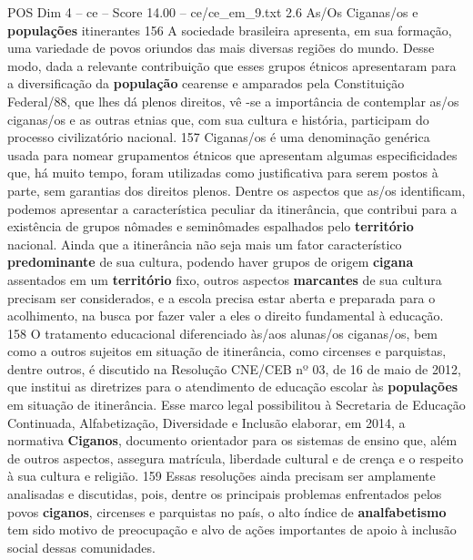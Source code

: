 \begin{textsample}{POS Dim 4 – ce – Score 14.00 – ce/ce\_em\_9.txt}  \label{ex:f4_pos_132}
2.6 As/Os Ciganas/os e \textbf{populações} itinerantes 156 A sociedade brasileira apresenta, em sua formação, uma variedade de povos oriundos das mais diversas regiões do mundo.
Desse modo, dada a relevante contribuição que esses grupos étnicos apresentaram para a diversificação da \textbf{população} cearense e amparados pela Constituição Federal/88, que lhes dá plenos direitos, vê -se a importância de contemplar as/os ciganas/os e as outras etnias que, com sua cultura e história, participam do processo civilizatório nacional. 157 Ciganas/os é uma denominação genérica usada para nomear grupamentos étnicos que apresentam algumas especificidades que, há muito tempo, foram utilizadas como justificativa para serem postos à parte, sem garantias dos direitos plenos.
Dentre os aspectos que as/os identificam, podemos apresentar a característica peculiar da itinerância, que contribui para a existência de grupos nômades e seminômades espalhados pelo \textbf{território} nacional.
Ainda que a itinerância não seja mais um fator característico \textbf{predominante} de sua cultura, podendo haver grupos de origem \textbf{cigana} assentados em um \textbf{território} fixo, outros aspectos \textbf{marcantes} de sua cultura precisam ser considerados, e a escola precisa estar aberta e preparada para o acolhimento, na busca por fazer valer a eles o direito fundamental à educação. 158 O tratamento educacional diferenciado às/aos alunas/os ciganas/os, bem como a outros sujeitos em situação de itinerância, como circenses e parquistas, dentre outros, é discutido na Resolução CNE/CEB nº 03, de 16 de maio de 2012, que institui as diretrizes para o atendimento de educação escolar às \textbf{populações} em situação de itinerância.
Esse marco legal possibilitou à Secretaria de Educação Continuada, Alfabetização, Diversidade e Inclusão elaborar, em 2014, a normativa \textbf{Ciganos}, documento orientador para os sistemas de ensino que, além de outros aspectos, assegura matrícula, liberdade cultural e de crença e o respeito à sua cultura e religião. 159 Essas resoluções ainda precisam ser amplamente analisadas e discutidas, pois, dentre os principais problemas enfrentados pelos povos \textbf{ciganos}, circenses e parquistas no país, o alto índice de \textbf{analfabetismo} tem sido motivo de preocupação e alvo de ações importantes de apoio à inclusão social dessas comunidades.

\end{textsample}
